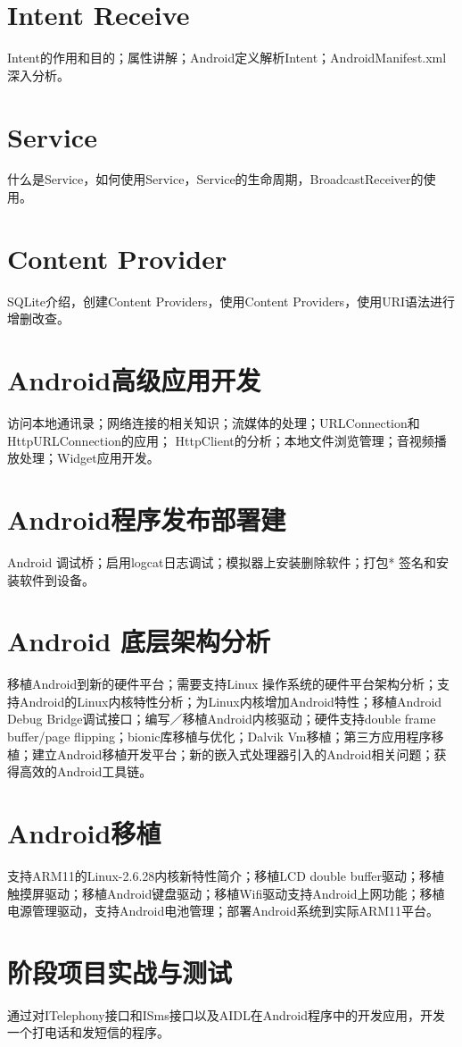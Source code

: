 \documentclass[9pt, b5paper]{article}
\begin{document}
\section{Intent Receive}
\label{sec-11}
Intent的作用和目的；属性讲解；Android定义解析Intent；AndroidManifest.xml深入分析。
\section{Service}
\label{sec-12}
什么是Service，如何使用Service，Service的生命周期，BroadcastReceiver的使用。
\section{Content Provider}
\label{sec-13}
SQLite介绍，创建Content Providers，使用Content Providers，使用URI语法进行增删改查。
\section{Android高级应用开发}
\label{sec-14}
访问本地通讯录；网络连接的相关知识；流媒体的处理；URLConnection和HttpURLConnection的应用；
HttpClient的分析；本地文件浏览管理；音视频播放处理；Widget应用开发。
\section{Android程序发布部署建}
\label{sec-15}
Android 调试桥；启用logcat日志调试；模拟器上安装删除软件；打包* 签名和安装软件到设备。
\section{Android 底层架构分析}
\label{sec-16}
移植Android到新的硬件平台；需要支持Linux 操作系统的硬件平台架构分析；支持Android的Linux内核特性分析；为Linux内核增加Android特性；移植Android Debug Bridge调试接口；编写／移植Android内核驱动；硬件支持double frame buffer/page flipping；bionic库移植与优化；Dalvik Vm移植；第三方应用程序移植；建立Android移植开发平台；新的嵌入式处理器引入的Android相关问题；获得高效的Android工具链。
\section{Android移植}
\label{sec-17}
支持ARM11的Linux-2.6.28内核新特性简介；移植LCD double buffer驱动；移植触摸屏驱动；移植Android键盘驱动；移植Wifi驱动支持Android上网功能；移植电源管理驱动，支持Android电池管理；部署Android系统到实际ARM11平台。
\section{阶段项目实战与测试}
\label{sec-18}
通过对ITelephony接口和ISms接口以及AIDL在Android程序中的开发应用，开发一个打电话和发短信的程序。
\end{document}
